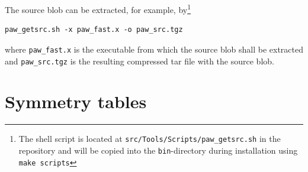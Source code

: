 \documentclass[final,12pt,makeidx,DIV=calc]{article}
\begin{document}
{{{{{{The source blob can be extracted, for example, by\footnote{The shell
script is located at \texttt{src/Tools/Scripts/paw\_getsrc.sh} in the
repository and will be copied into the \texttt{bin}-directory during
installation using \texttt{make scripts}}
\begin{verbatim}
paw_getsrc.sh -x paw_fast.x -o paw_src.tgz
\end{verbatim}
where \verb|paw_fast.x| is the executable from which the source blob
shall be extracted and \verb|paw_src.tgz| is the resulting compressed
tar file with the source blob.


\newpage
\section{Symmetry tables}\label{section:symmetry_tables}
}}}}}}
\end{document}
